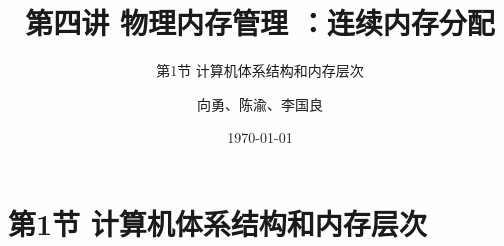 


\title[第4讲]{第四讲 物理内存管理 ：连续内存分配} %
\subtitle{第1节 计算机体系结构和内存层次}
\author{向勇、陈渝、李国良} %
\date{\today} %



\begin{frame}
\titlepage %
\end{frame}


\section{第1节 计算机体系结构和内存层次}%
